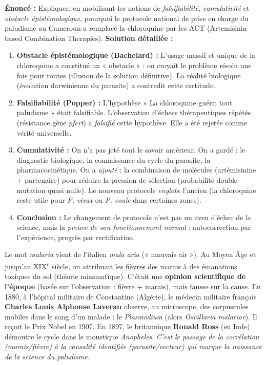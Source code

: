 \documentclass[11pt]{article}
\begin{document}
\begin{exoresolu}
\textbf{Énoncé :} Expliquer, en mobilisant les notions de \emph{falsifiabilité}, \emph{cumulativité} et \emph{obstacle épistémologique}, pourquoi le protocole national de prise en charge du paludisme au Cameroun a remplacé la chloroquine par les ACT (Artemisinin-based Combination Therapies).
\tcblower
\textbf{Solution détaillée :}
\begin{enumerate}
    \item \textbf{Obstacle épistémologique (Bachelard) :} L'usage massif et unique de la chloroquine a constitué un « obstacle » : on croyait le problème résolu une fois pour toutes (illusion de la solution définitive). La réalité biologique (évolution darwinienne du parasite) a contredit cette certitude.
    \item \textbf{Falsifiabilité (Popper) :} L'hypothèse « La chloroquine guérit tout paludisme » était falsifiable. L'observation d'échecs thérapeutiques répétés (résistance gène \emph{pfcrt}) a \emph{falsifié} cette hypothèse. Elle a été rejetée comme vérité universelle.
    \item \textbf{Cumulativité :} On n'a pas jeté tout le savoir antérieur. On a gardé : le diagnostic biologique, la connaissance du cycle du parasite, la pharmacocinétique. On a \emph{ajouté} : la combinaison de molécules (artémisinine + partenaire) pour réduire la pression de sélection (probabilité double mutation quasi nulle). Le nouveau protocole \emph{englobe} l'ancien (la chloroquine reste utile pour \emph{P. vivax} ou \emph{P. ovale} dans certaines zones).
    \item \textbf{Conclusion :} Le changement de protocole n'est pas un aveu d'échec de la science, mais la \emph{preuve de son fonctionnement normal} : autocorrection par l'expérience, progrès par rectification.
\end{enumerate}
\end{exoresolu}

\begin{exemplebox}
Le mot \emph{malaria} vient de l'italien \emph{mala aria} (« mauvais air »). Au Moyen Âge et jusqu'au XIX\textsuperscript{e} siècle, on attribuait les fièvres des marais à des émanations toxiques du sol (théorie miasmatique). C'était une \textbf{opinion scientifique de l'époque} (basée sur l'observation : fièvre + marais), mais fausse sur la cause.
En 1880, à l'hôpital militaire de Constantine (Algérie), le médecin militaire français \textbf{Charles Louis Alphonse Laveran} observe, au microscope, des corpuscules mobiles dans le sang d'un malade : le \emph{Plasmodium} (alors \emph{Oscillaria malariae}). Il reçoit le Prix Nobel en 1907.
En 1897, le britannique \textbf{Ronald Ross} (en Inde) démontre le cycle dans le moustique \emph{Anopheles}.
\emph{C'est le passage de la corrélation (marais/fièvre) à la causalité identifiée (parasite/vecteur) qui marque la naissance de la science du paludisme.}
\end{exemplebox}
\end{document}
